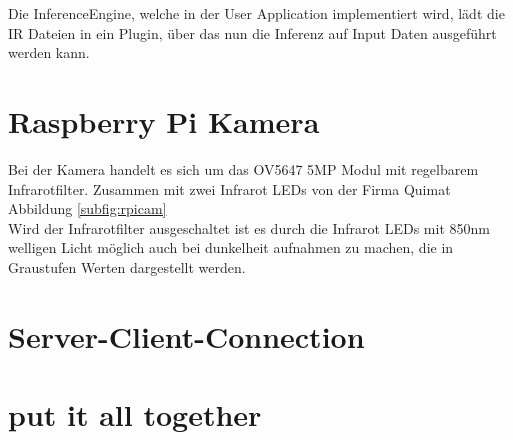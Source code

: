 Die InferenceEngine, welche in der User Application implementiert 
wird, lädt die IR Dateien in ein Plugin, über das nun die Inferenz 
auf Input Daten ausgeführt werden kann.



\section{Raspberry Pi Kamera}\label{sec:raspicam}


Bei der Kamera handelt es sich um das OV5647 5MP Modul mit regelbarem 
Infrarotfilter. Zusammen mit zwei Infrarot LEDs von der Firma Quimat 
Abbildung \ref{subfig:rpicam}
\\
Wird der Infrarotfilter ausgeschaltet ist es durch die Infrarot LEDs mit 
850nm welligen Licht möglich auch bei dunkelheit aufnahmen zu machen, 
die in Graustufen Werten dargestellt werden.



\section{Server-Client-Connection}\label{sec:serverclient}





\section{put it all together}\label{sec:ka}







